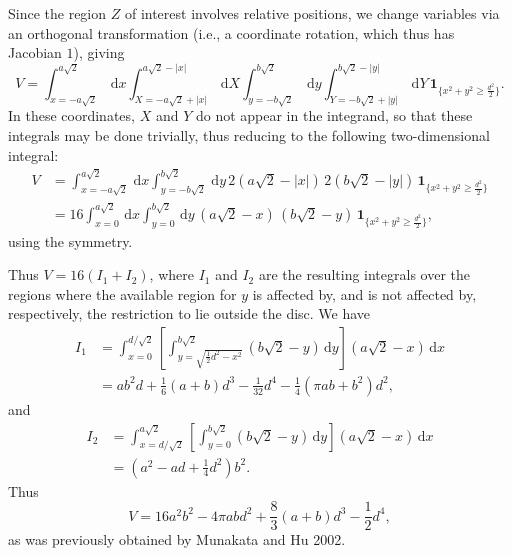 \documentclass[a4paper,10pt]{article}
\newcommand{\rd}{\, \mathrm{d}}
\newcommand{\indicator}[1]{\mathbf{1}_{ \{   #1 \} } }
\begin{document}
Since the region $Z$ of interest involves relative positions, we change variables via an orthogonal transformation (i.e., a coordinate rotation, which thus has Jacobian $1$), giving
\begin{equation}
 V = \int_{x=-a \sqrt{2}}^{a \sqrt{2}} \rd x 
\int_{X=-a \sqrt{2} + |x| }^{a \sqrt{2} - |x|}  \rd X
 \int_{y=-b \sqrt{2}}^{b \sqrt{2}} \rd y
\int_{Y=-b \sqrt{2} + |y| }^{b \sqrt{2}-|y|}  \rd Y
\, \indicator{ x^2 + y^2 \ge \frac{d^2}{2}  }.
\end{equation}
In these coordinates, $X$ and $Y$ do not appear in the integrand, so that these integrals may be done trivially, thus reducing to the following two-dimensional integral:
\begin{align}
 V &= \int_{x=-a \sqrt{2}}^{a \sqrt{2}} \rd x  \int_{y=-b \sqrt{2}}^{b \sqrt{2}} \rd y
\, 2 \left( a \sqrt{2} - |x| \right) \, 2 \left( b \sqrt{2} - |y| \right) \,  \indicator{ x^2 + y^2 \ge \frac{d^2}{2} } \\
&= 16 \int_{x=0}^{a \sqrt{2}} \rd x  \int_{y=0}^{b \sqrt{2}} \rd y
\, \left( a \sqrt{2} - x \right) \, \left( b \sqrt{2} - y \right) \,  \indicator{ x^2 + y^2 \ge \frac{d^2}{2} },
\end{align}
using the symmetry.

Thus $V = 16(I_1 + I_2)$, where $I_1$ and $I_2$ are the resulting integrals over the regions where the available region for $y$ is affected by, and is not affected by, respectively, the restriction to lie outside the disc.
We have
\begin{align}
 I_1 &= \int_{x=0}^{d / \sqrt{2}} \left[ \int_{y = \sqrt{\frac{1}{2} {d^2} - x^2}}^{b \sqrt{2}} \left( b \sqrt{2} - y \right) \rd y \right]  \left( a \sqrt{2} - x \right) \rd x \\
&= 	
a b^{2} d + \textstyle \frac{1}{6} (a+b) d^{3} - \frac{1}{32}  d^{4} - \frac{1}{4} {\left(\pi a b + b^{2}\right)} d^{2},
\end{align}
and
\begin{align}
 I_2 &= \int_{x=d / \sqrt{2}}^{a \sqrt{2}} \left[ \int_{y = 0}^{b \sqrt{2}} \left( b \sqrt{2} - y \right) \rd y \right]  \left( a \sqrt{2} - x \right) \rd x \\
&=	
{\left( a^{2} - a d + \textstyle \frac{1}{4}  d^{2}\right)} b^{2}.
\end{align}
Thus 
\begin{equation}
 V %
= 16 a^{2} b^{2}  - 4 \pi a b d^{2} + \textstyle \frac{8}{3} (a+b) d^{3}  - \frac{1}{2} d^{4},
\end{equation}
as was previously obtained by Munakata and Hu 2002.
\end{document}
